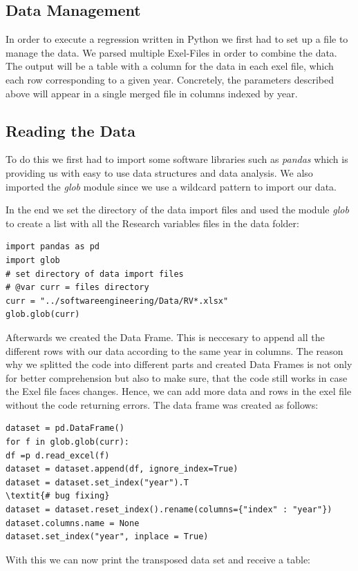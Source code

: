 \documentclass[12pt,a4paper,bibliography=totocnumbered,listof=totocnumbered]{scrartcl}
\begin{document}
\subsection{Data Management}
In order to execute a regression written in Python we first had to set up a file to manage the data. We parsed multiple Exel-Files in order to combine the data. The output will be a table with a column for the data in each exel file, which each row corresponding to a given year. Concretely, the parameters described above will appear in a single merged file in columns indexed by year. 
\subsection{Reading the Data}

To do this we first had to import some software libraries such as \textit{pandas} which is providing us with easy to use data structures and data analysis. We also imported the \textit{glob} module since we use a wildcard pattern to import our data. 

In the end we set the directory of the data import files and used the module \textit{glob} to create a list with all the Research variables files in the data folder:

\begin{verbatim}
import pandas as pd
import glob
# set directory of data import files
# @var curr = files directory
curr = "../softwareengineering/Data/RV*.xlsx"
glob.glob(curr)
\end{verbatim}


Afterwards we created the Data Frame. This is neccesary to append all the different rows with our data according to the same year in columns. The reason why we splitted the code into different parts and created Data Frames is not only for better comprehension but also to make sure, that the code still works in case the Exel file faces changes. Hence, we can add more data and rows in the exel file without the code returning errors. The data frame was created as follows:
\begin{verbatim}
dataset = pd.DataFrame()
for f in glob.glob(curr):
df =p d.read_excel(f)
dataset = dataset.append(df, ignore_index=True)
dataset = dataset.set_index("year").T
\textit{# bug fixing}
dataset = dataset.reset_index().rename(columns={"index" : "year"})
dataset.columns.name = None
dataset.set_index("year", inplace = True)
\end{verbatim}

With this we can now print the transposed data set and receive a table:
\end{document}
